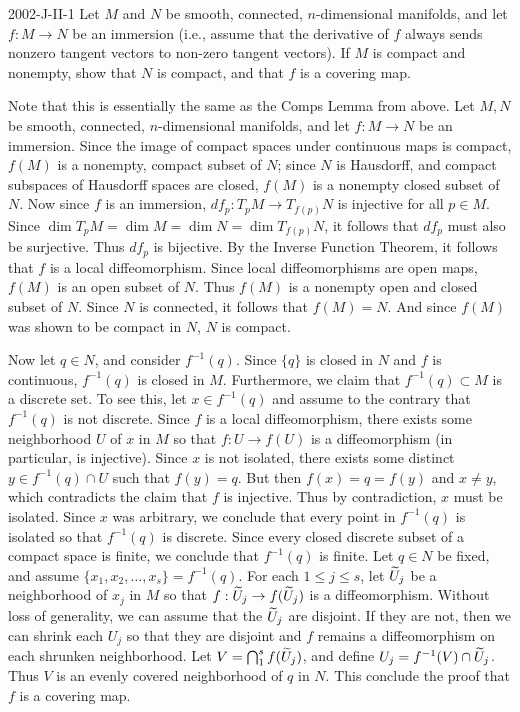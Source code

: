 \documentclass{article}
\begin{document}
	\begin{prb}{2002-J-II-1}
		Let $M$ and $N$ be smooth, connected, $n$-dimensional manifolds, and let $f: M \to N$ be an immersion (i.e., assume that the derivative of $f$ always sends nonzero tangent vectors to non-zero tangent vectors). If $M$ is compact and nonempty, show that $N$ is compact, and that $f$ is a covering map. 
	\end{prb}
	Note that this is essentially the same as the Comps Lemma from above. Let $M, N$ be smooth, connected, $n$-dimensional manifolds, and let $f: M \to N$ be an immersion. Since the image of compact spaces under continuous maps is compact, $f(M)$ is a nonempty, compact subset of $N$; since $N$ is Hausdorff, and compact subspaces of Hausdorff spaces are closed, $f(M)$ is a nonempty closed subset of $N$. Now since $f$ is an immersion, $df_{p}: T_{p}M \to T_{f(p)}N$ is injective for all $p \in M$. Since $\dim{T_{p}M} = \dim{M} = \dim{N} = \dim{T_{f(p)}N}$, it follows that $df_{p}$ must also be surjective. Thus $df_{p}$ is bijective. By the Inverse Function Theorem, it follows that $f$ is a local diffeomorphism. Since local diffeomorphisms are open maps, $f(M)$ is an open subset of $N$. Thus $f(M)$ is a nonempty open and closed subset of $N$. Since $N$ is connected, it follows that $f(M) = N$. And since $f(M)$ was shown to be compact in $N$, $N$ is compact. 
	
	Now let $q \in N$, and consider $f^{-1}(q)$. Since $\{q\}$ is closed in $N$ and $f$ is continuous, $f^{-1}(q)$ is closed in $M$. Furthermore, we claim that $f^{-1}(q) \subset M$ is a discrete set. To see this, let $x \in f^{-1}(q)$ and assume to the contrary that $f^{-1}(q)$ is not discrete. Since $f$ is a local diffeomorphism, there exists some neighborhood $U$ of $x$ in $M$ so that $f: U \to f(U)$ is a diffeomorphism (in particular, is injective). Since $x$ is not isolated, there exists some distinct $y \in f^{-1}(q) \cap U$ such that $f(y) = q$. But then $f(x) = q = f(y)$ and $x \neq y$, which contradicts the claim that $f$ is injective. Thus by contradiction, $x$ must be isolated. Since $x$ was arbitrary, we conclude that every point in $f^{-1}(q)$ is isolated so that $f^{-1}(q)$ is discrete. Since every closed discrete subset of a compact space is finite, we conclude that $f^{-1}(q)$ is finite. Let $q \in N$ be fixed, and assume $\{x_{1}, x_{2}, \ldots, x_{s}\} = f^{-1}(q)$. For each $1 \leq j \leq s$, let $\widetilde{U}_{j}$ be a neighborhood of $x_{j}$ in $M$ so that $f: \widetilde{U}_{j} \to f(\widetilde{U}_{j})$ is a diffeomorphism. Without loss of generality, we can assume that the $\widetilde{U}_{j}$ are disjoint. If they are not, then we can shrink each $U_{j}$ so that they are disjoint and $f$ remains a diffeomorphism on each shrunken neighborhood. Let $V = \bigcap_{1}^{s}f(\widetilde{U}_{j})$, and define $U_{j} = f^{-1}(V) \cap \widetilde{U}_{j}$. Thus $V$ is an evenly covered neighborhood of $q$ in $N$. This conclude the proof that $f$ is a covering map. 
	
\end{document}
